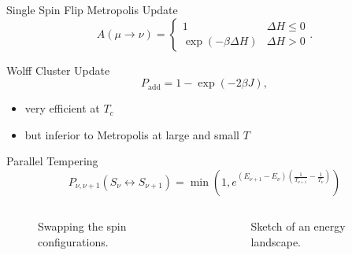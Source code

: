 \documentclass{beamer}
\newcommand{\brac}[1]{\ensuremath{\left(#1\right)}}
\begin{document}
        \begin{frame}{Single Spin Flip Metropolis Update \cite{Metropolis1953}}
            \begin{equation}
                A(\mu \to \nu) =
                \begin{cases}
                    1                            & \Delta H \le 0 \\
                    \exp{\brac{-\beta \Delta H}} & \Delta H > 0
                \end{cases}.
            \end{equation}
        \end{frame}

        \begin{frame}{Wolff Cluster Update \cite{Wolff1989}}
            \begin{equation}
                P_{\mathrm{add}} = 1-\exp\brac{-2\beta J},
            \end{equation}
            \pause
            \begin{itemize}[<+->]
                \item very efficient at \(T_{c}\)
                \item but inferior to Metropolis at large and small \(T\)
            \end{itemize}
        \end{frame}

        \begin{frame}{Parallel Tempering \cite{ParallelTempering1986}}
            \begin{equation}
                P_{\nu,\nu+1}(S_\nu \leftrightarrow S_{\nu+1}) = \min\brac{1,e^{\brac{E_{\nu+1}-E_\nu}\brac{\frac{1}{T_{\nu+1}}-\frac{1}{T_\nu}}}}
            \end{equation}
            \begin{columns}[b]
                \begin{column}{5cm}
                    \begin{figure}[htbp]
                        \centering
                        
                        \caption
                        {
                            Swapping the spin configurations.
                        }
                    \end{figure}
                \end{column}
                \pause
                \begin{column}{6cm}
                    \begin{figure}[htbp]
                        \centering
                        
                        \caption
                        {
                            Sketch of an energy landscape.
                        }
                    \end{figure}
                \end{column}
            \end{columns}
        \end{frame}
\end{document}
